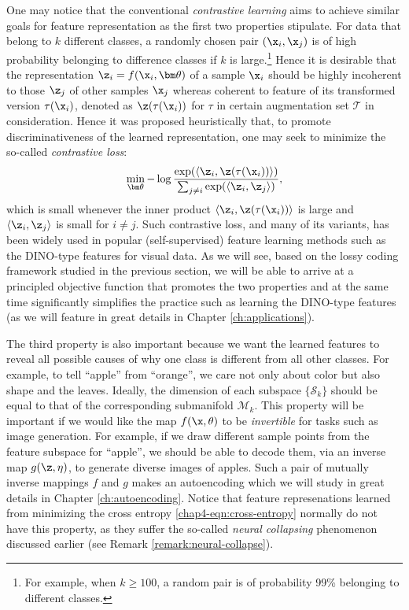 \documentclass[../../book-main.tex]{subfiles}
\begin{document}
\begin{remark} 
One may notice that the conventional {\em contrastive learning} \citep{hadsell2006dimensionality,oord2018representation,he2019momentum} aims to achieve similar goals for feature representation as the first two properties stipulate. For data that belong to $k$ different classes, a randomly chosen pair $(\x_i, \x_j)$ is of high probability belonging to difference classes if $k$ is large.\footnote{For example, when $k \ge 100$, a random pair is of probability 99\% belonging to different classes.} Hence it is desirable that the representation $\z_i = f(\x_i, \bm \theta)$ of a sample $\x_i$ should be highly incoherent to those $\z_j$ of other samples $\x_j$ whereas coherent to feature of its transformed version $\tau(\x_i)$, denoted as $\z(\tau(\x_i))$ for $\tau$ in certain augmentation set $\mathcal T$ in consideration. Hence it was proposed heuristically that, to promote  discriminativeness of the learned representation, one may seek to minimize the so-called {\em contrastive loss}: \begin{equation}
\min_{\bm \theta} - \log \frac{\exp(\langle \z_i, \z(\tau(\x_i))\rangle)}{\sum_{j\not= i} \exp(\langle \z_i, \z_j\rangle)},
\label{eqn:contrastive-loss}
\end{equation}
which is small whenever the inner product $\langle \z_i, \z(\tau(\x_i))\rangle$ is large and $\langle \z_i, \z_j\rangle$ is small for $i \not= j$. Such contrastive loss, and many of its variants, has been widely used in popular (self-supervised) feature learning methods such as the DINO-type features \cite{caron2021unsupervisedlearningvisualfeatures,DINOv2} for visual data. As we will see, based on the lossy coding framework studied in the previous section, we will be able to arrive at a principled objective function that promotes the two properties and at the same time significantly simplifies the practice such as learning the DINO-type features (as we will feature in great details in Chapter \ref{ch:applications}).  
\end{remark}

The third property is also important because we want the learned features to reveal all possible causes of why one class is different from all other classes. For example, to tell ``apple'' from ``orange'', we care not only about color but also shape and the leaves. Ideally, the dimension of each subspace $\{\mathcal{S}_k\}$ should be equal to that of the corresponding submanifold $\mathcal{M}_k$. This property will be important if we would like the map $f(\x,\theta)$ to be {\em invertible} for tasks such as image generation. For example, if we draw different sample points from the feature subspace for ``apple'', we should be able to decode them, via an inverse map $g(\z, \eta)$, to generate diverse images of apples. Such a pair of mutually inverse mappings $f$ and $g$ makes an autoencoding which we will study in great details in Chapter \ref{ch:autoencoding}. Notice that feature represenations learned from minimizing the cross entropy \eqref{chap4-eqn:cross-entropy} normally do not have this property, as they suffer the so-called {\em neural   collapsing} phenomenon discussed earlier (see Remark \ref{remark:neural-collapse}).
\end{document}
